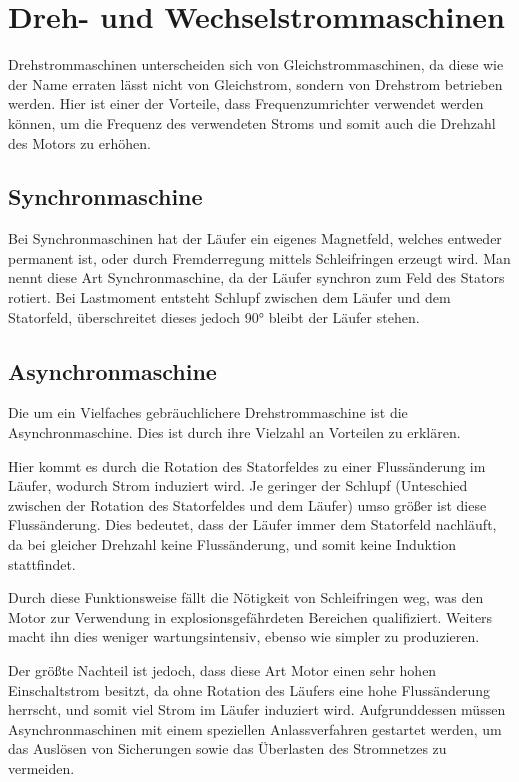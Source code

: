 \chapter{Dreh- und Wechselstrommaschinen}

Drehstrommaschinen unterscheiden sich von Gleichstrommaschinen, da diese wie der Name erraten lässt nicht von Gleichstrom, sondern von Drehstrom betrieben werden.
Hier ist einer der Vorteile, dass Frequenzumrichter verwendet werden können, um die Frequenz des verwendeten Stroms und somit auch die Drehzahl des Motors zu erhöhen.

\section{Synchronmaschine}

Bei Synchronmaschinen hat der Läufer ein eigenes Magnetfeld, welches entweder permanent ist, oder durch Fremderregung mittels Schleifringen erzeugt wird.
Man nennt diese Art Synchronmaschine, da der Läufer synchron zum Feld des Stators rotiert.
Bei Lastmoment entsteht Schlupf zwischen dem Läufer und dem Statorfeld, überschreitet dieses jedoch 90° bleibt der Läufer stehen.
\cite{sydewiki:204475526}

\section{Asynchronmaschine}

Die um ein Vielfaches gebräuchlichere Drehstrommaschine ist die Asynchronmaschine.
Dies ist durch ihre Vielzahl an Vorteilen zu erklären.

Hier kommt es durch die Rotation des Statorfeldes zu einer Flussänderung im Läufer, wodurch Strom induziert wird.
Je geringer der Schlupf (Unteschied zwischen der Rotation des Statorfeldes und dem Läufer) umso größer ist diese Flussänderung.
Dies bedeutet, dass der Läufer immer dem Statorfeld nachläuft, da bei gleicher Drehzahl keine Flussänderung, und somit keine Induktion stattfindet.

Durch diese Funktionsweise fällt die Nötigkeit von Schleifringen weg, was den Motor zur Verwendung in explosionsgefährdeten Bereichen qualifiziert.
Weiters macht ihn dies weniger wartungsintensiv, ebenso wie simpler zu produzieren.

Der größte Nachteil ist jedoch, dass diese Art Motor einen sehr hohen Einschaltstrom besitzt, da ohne Rotation des Läufers eine hohe Flussänderung herrscht, und somit viel Strom im Läufer induziert wird.
Aufgrunddessen müssen Asynchronmaschinen mit einem speziellen Anlassverfahren gestartet werden, um das Auslösen von Sicherungen sowie das Überlasten des Stromnetzes zu vermeiden.
\cite{asdewiki:206736532}